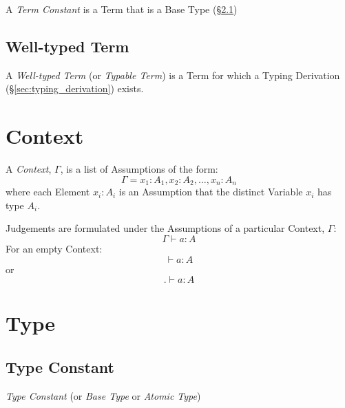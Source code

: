 A \emph{Term Constant} is a Term that is a Base Type
(\S\ref{sec:type_constant})



\subsection{Well-typed Term}\label{sec:well_typed}

A \emph{Well-typed Term} (or \emph{Typable Term}) is a Term for which
a Typing Derivation (\S\ref{sec:typing_derivation}) exists.



\section{Context}\label{sec:type_context}

A \emph{Context}, $\Gamma$, is a list of Assumptions of the form:
\[
  \Gamma = x_1 : A_1, x_2 : A_2, \ldots, x_n : A_n
\]
where each Element $x_i : A_i$ is an Assumption that the distinct
Variable $x_i$ has type $A_i$.

Judgements are formulated under the Assumptions of a particular
Context, $\Gamma$:
\[
  \Gamma \vdash a : A
\]
For an empty Context:
\[
  \vdash a : A
\]
or
\[
  . \vdash a : A
\]



\section{Type}\label{sec:type}

\subsection{Type Constant}\label{sec:type_constant}

\emph{Type Constant} (or \emph{Base Type} or \emph{Atomic Type})




